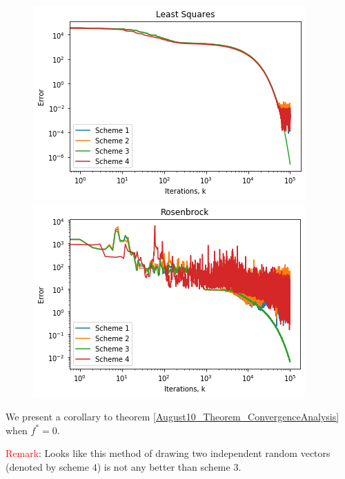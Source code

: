 \documentclass{article}
\begin{document}
\begin{figure}[h]
	\centering
	\begin{minipage}[b]{0.45\linewidth}
		\includegraphics[scale=0.5]{tex_images/4thSchemeLS.png}
	\end{minipage}
	\quad
	\begin{minipage}[b]{0.45\linewidth}
		\includegraphics[scale=0.5]{tex_images/4thSchemeRosenbrock.png}
	\end{minipage}
	\end{figure}

We present a corollary to theorem \ref{August10_Theorem_ConvergenceAnalysis} when $f^* = 0$. \newline 


\textcolor{red}{Remark}: Looks like this method of drawing two independent random vectors (denoted by scheme $4$) is not any better than scheme $3$. 
\end{document}
